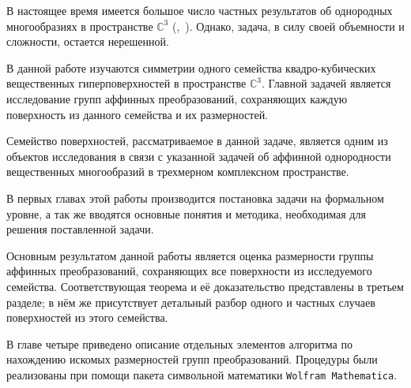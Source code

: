 \documentclass[a4paper,14pt]{extarticle}
\begin{document}
В настоящее время имеется большое число частных результатов об однородных многообразиях в пространстве $\mathbb{C}^3$ (\cite{ALS},~\cite{loboda_hodarev}). Однако, задача, в силу своей объемности и сложности, остается нерешенной. 

В данной работе изучаются симметрии одного семейства квадро-кубических вещественных гиперповерхностей в пространстве $\mathbb{C}^3$. Главной задачей является исследование групп аффинных преобразований, сохраняющих каждую поверхность из данного семейства и их размерностей. 

Семейство поверхностей, рассматриваемое в данной задаче, является одним из объектов исследования в связи с указанной задачей об аффинной однородности вещественных многообразий в трехмерном комплексном пространстве.

В первых главах этой работы производится постановка задачи на формальном уровне, а так же вводятся основные понятия и методика, необходимая для решения поставленной задачи.

Основным результатом данной работы является оценка размерности группы аффинных преобразований, сохраняющих все поверхности из исследуемого семейства. Соответствующая теорема и её доказательство представлены в третьем разделе; в нём же присутствует детальный разбор одного и частных случаев поверхностей из этого семейства.

В главе четыре приведено описание отдельных элементов алгоритма по нахождению искомых размерностей групп преобразований. Процедуры были реализованы при помощи пакета символьной математики \verb|Wolfram Mathematica|.


\end{document}
